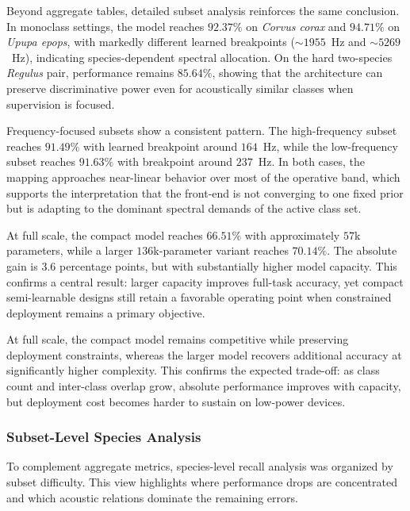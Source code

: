 \documentclass[a4paper,singleside,12pt]{report} %
\begin{document}
	Beyond aggregate tables, detailed subset analysis reinforces the same conclusion. In monoclass settings, the model reaches \(92.37\%\) on \emph{Corvus corax} and \(94.71\%\) on \emph{Upupa epops}, with markedly different learned breakpoints (\(\sim 1955\)~Hz and \(\sim 5269\)~Hz), indicating species-dependent spectral allocation. On the hard two-species \emph{Regulus} pair, performance remains \(85.64\%\), showing that the architecture can preserve discriminative power even for acoustically similar classes when supervision is focused.

	Frequency-focused subsets show a consistent pattern. The high-frequency subset reaches \(91.49\%\) with learned breakpoint around \(164\)~Hz, while the low-frequency subset reaches \(91.63\%\) with breakpoint around \(237\)~Hz. In both cases, the mapping approaches near-linear behavior over most of the operative band, which supports the interpretation that the front-end is not converging to one fixed prior but is adapting to the dominant spectral demands of the active class set.

	At full scale, the compact model reaches \(66.51\%\) with approximately \(57\)k parameters, while a larger \(136\)k-parameter variant reaches \(70.14\%\). The absolute gain is \(3.6\) percentage points, but with substantially higher model capacity. This confirms a central result: larger capacity improves full-task accuracy, yet compact semi-learnable designs still retain a favorable operating point when constrained deployment remains a primary objective.

	At full scale, the compact model remains competitive while preserving deployment constraints, whereas the larger model recovers additional accuracy at significantly higher complexity. This confirms the expected trade-off: as class count and inter-class overlap grow, absolute performance improves with capacity, but deployment cost becomes harder to sustain on low-power devices.
	\subsubsection{Subset-Level Species Analysis}
	To complement aggregate metrics, species-level recall analysis was organized by subset difficulty. This view highlights where performance drops are concentrated and which acoustic relations dominate the remaining errors.
\end{document}
